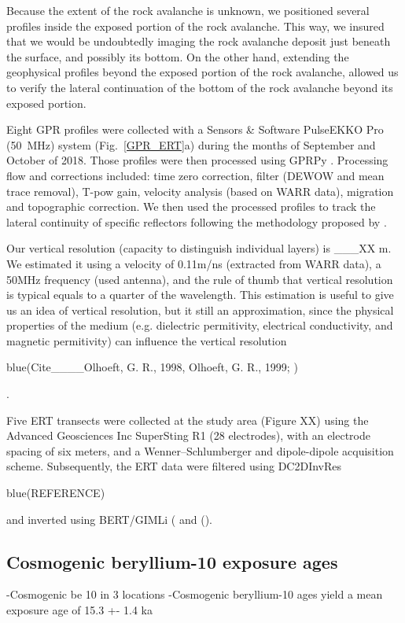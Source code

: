 \documentclass[5p]{elsarticle}
\newcommand{\COMON}{\begin{color}{blue}}
\newcommand{\COMOFF}{\end{color}}
\begin{document}
Because the extent of the rock avalanche is unknown, we positioned several profiles  inside the exposed portion of the rock avalanche. This way, we insured that we would be undoubtedly imaging the rock avalanche deposit just beneath the surface, and possibly its bottom. On the other hand, extending the geophysical profiles beyond the exposed portion of the rock avalanche,  allowed us to verify the lateral continuation of the bottom of the rock avalanche beyond its exposed portion. 

Eight GPR profiles were collected with a Sensors \& Software PulseEKKO Pro (\SI{50}{\mega Hz}) system (Fig.~\ref{GPR_ERT}a) during the months of September and October of 2018. Those profiles were then processed using GPRPy \citep{plattner2019comunity}. Processing flow and corrections included: time zero correction, filter (DEWOW and mean trace removal), T-pow gain, velocity analysis (based on WARR data), migration \citep{stolt1978migration} and topographic correction. We then used the processed profiles to track the lateral continuity of specific reflectors following the methodology proposed by \citep{mitchum1977seismic}.
	
Our vertical resolution (capacity to distinguish individual layers) is ___XX m. We estimated it using a velocity of 0.11m/ns (extracted from WARR data), a 50MHz frequency (used antenna), and the rule of thumb that vertical resolution is typical equals to a quarter of the wavelength. This estimation is useful to give us an idea of vertical resolution, but it still an approximation, since the physical properties of the medium (e.g. dielectric permitivity, electrical conductivity, and magnetic permitivity) can influence the vertical resolution \COMON (Cite____Olhoeft, G. R., 1998, Olhoeft, G. R., 1999; \citep{neal2004ground}) \COMOFF.


Five ERT transects were collected at the study area (Figure XX) using the Advanced Geosciences Inc SuperSting R1 (28 electrodes), with an electrode spacing of six meters, and a Wenner–Schlumberger and dipole-dipole acquisition scheme. Subsequently, the ERT data were filtered using DC2DInvRes \COMON (REFERENCE) \COMOFF and inverted using BERT/GIMLi (\cite{gunther2006three} and (\cite{Ruecker2017}).


\subsection{Cosmogenic beryllium-10 exposure ages}

-Cosmogenic be 10 in 3 locations
-Cosmogenic beryllium-10 ages yield a mean exposure age of 15.3 +- 1.4 ka
\end{document}

